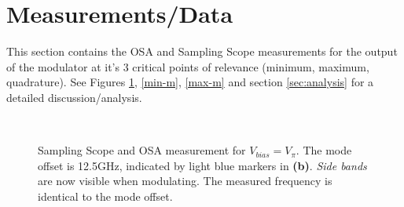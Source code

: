 \documentclass[12pt,a4paper]{report}
\begin{document}
\section{Measurements/Data}\label{sec:data}
This section contains the OSA and Sampling Scope measurements for the output of the modulator at it's 3 critical points of relevance (minimum, maximum, quadrature). See Figures \ref{quad-m}, \ref{min-m}, \ref{max-m} and section \ref{sec:analysis} for a detailed discussion/analysis.
\begin{figure}
    \centering
    \quad
    \\
    \vspace{0.45cm}
    \caption{Sampling Scope and OSA measurement for $V_{bias}=V_{\pi}$. The mode offset is 12.5GHz, indicated by light blue markers in \textbf{(b)}. \emph{Side bands} are now visible when modulating. The measured frequency is identical to the mode offset.}
    \label{quad-m}
    \vspace{-12pt}
\end{figure}
\end{document}
